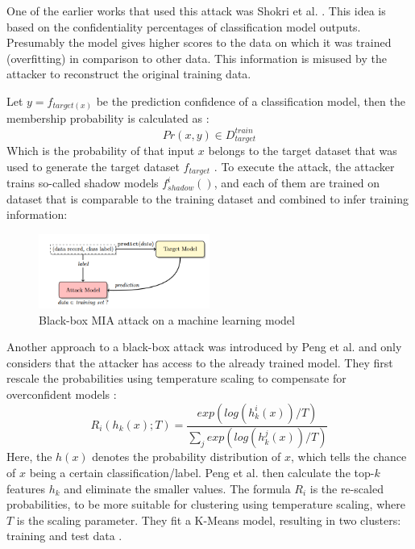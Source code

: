 One of the earlier works that used this attack was Shokri et al. \citep{shokri_membership_2017}.
This idea is based on the confidentiality percentages of classification model outputs. Presumably the model gives higher scores to the data on which it was trained (overfitting) in comparison to other data. This information is misused by the attacker to reconstruct the original training data.

Let $y = f_{target(x)}$ be the prediction confidence of a classification model, then the membership probability is calculated as \citep{shokri_membership_2017}:
\begin{equation}
  Pr(x, y) \in D^{train}_{target}
\end{equation}
Which is the probability of that input $x$ belongs to the target dataset that was used to generate the target dataset $f_{target}$ \citep{shokri_membership_2017}.
To execute the attack, the attacker trains so-called shadow models $f^i_{shadow}()$, and each of them are trained on dataset that is comparable to the training dataset and combined to infer training information:
\begin{figure}[H]
  \includegraphics[width=0.5\textwidth]{TheorethicalFramework/AttacksOnPrivacy/shadow-models-mi.png}
  \caption{Black-box MIA attack on a machine learning model \citep{shokri_membership_2017}}
\end{figure}

Another approach to a black-box attack was introduced by Peng et al. and only considers that the attacker has access to the already trained model.
They first rescale the probabilities using temperature scaling to compensate for overconfident models \citep{peng_unsupervised_nodate}:
\begin{equation}
  R_i(h_k(x);T) = \frac{exp(log(h^i_k(x))/T)}{\sum_j{exp(log(h^j_k(x))/T)}}
\end{equation}
Here, the $h(x)$ denotes the probability distribution of $x$, which tells the chance of $x$ being a certain classification/label. Peng et al. then calculate the top-$k$ features $h_k$ and eliminate the smaller values.
The formula $R_i$ is the re-scaled probabilities, to be more suitable for clustering using temperature scaling, where $T$ is the scaling parameter.
They fit a K-Means model, resulting in two clusters: training and test data \citep{peng_unsupervised_nodate}.

